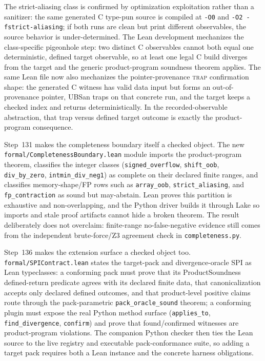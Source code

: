 \documentclass[10pt,a4paper]{article}
\begin{document}
The strict-aliasing class is confirmed by optimization exploitation rather than
a sanitizer: the same generated C type-pun source is compiled at \texttt{-O0}
and \texttt{-O2 -fstrict-aliasing}; if both runs are clean but print different
observables, the source behavior is under-determined. The Lean development
mechanizes the class-specific pigeonhole step: two distinct C observables cannot
both equal one deterministic, defined target observable, so at least one legal C
build diverges from the target and the generic product-program soundness theorem
applies.  The same Lean file now also mechanizes the pointer-provenance
\textsc{trap} confirmation shape: the generated C witness has valid data input
but forms an out-of-provenance pointer, UBSan traps on that concrete run, and the
target keeps a checked index and returns deterministically.  In the
recorded-observable abstraction, that trap versus defined target outcome is
exactly the product-program consequence.

Step~131 makes the completeness boundary itself a checked object.  The new
\texttt{formal/CompletenessBoundary.lean} module imports the product-program
theorem, classifies the integer classes
(\texttt{signed\_overflow}, \texttt{shift\_oob}, \texttt{div\_by\_zero},
\texttt{intmin\_div\_neg1}) as complete on their declared finite ranges, and
classifies memory-shape/FP rows such as \texttt{array\_oob},
\texttt{strict\_aliasing}, and \texttt{fp\_contraction} as sound but
may-abstain.  Lean proves this partition is exhaustive and non-overlapping, and
the Python driver builds it through Lake so imports and stale proof artifacts
cannot hide a broken theorem.  The result deliberately does not overclaim:
finite-range no-false-negative evidence still comes from the independent
brute-force/Z3 agreement check in \texttt{completeness.py}.

Step~136 makes the extension surface a checked object too.
\texttt{formal/SPIContract.lean} states the target-pack and divergence-oracle
SPI as Lean typeclasses: a conforming pack must prove that its ProductSoundness
defined-return predicate agrees with its declared finite data, that
canonicalization accepts only declared defined outcomes, and that product-level
positive claims route through the pack-parametric \texttt{pack\_oracle\_sound}
theorem; a conforming plugin must expose the real Python method surface
(\texttt{applies\_to}, \texttt{find\_divergence}, \texttt{confirm}) and prove
that found/confirmed witnesses are product-program violations.  The companion
Python checker then ties the Lean source to the live registry and executable
pack-conformance suite, so adding a target pack requires both a Lean instance and
the concrete harness obligations.
\end{document}
